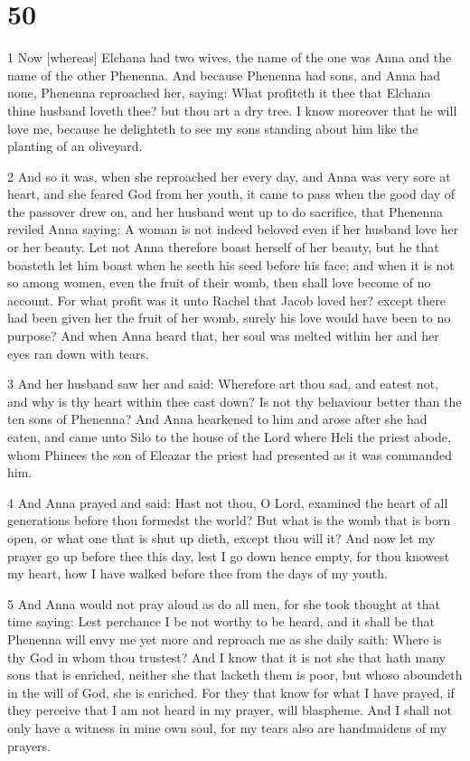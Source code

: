 \chapter{50}

\par 1 Now [whereas] Elchana had two wives, the name of the one was Anna and the name of the other Phenenna. And because Phenenna had sons, and Anna had none, Phenenna reproached her, saying: What profiteth it thee that Elchana thine husband loveth thee? but thou art a dry tree. I know moreover that he will love me, because he delighteth to see my sons standing about him like the planting of an oliveyard. 

\par 2 And so it was, when she reproached her every day, and Anna was very sore at heart, and she feared God from her youth, it came to pass when the good day of the passover drew on, and her husband went up to do sacrifice, that Phenenna reviled Anna saying: A woman is not indeed beloved even if her husband love her or her beauty. Let not Anna therefore boast herself of her beauty, but he that boasteth let him boast when he seeth his seed before his face; and when it is not so among women, even the fruit of their womb, then shall love become of no account. For what profit was it unto Rachel that Jacob loved her? except there had been given her the fruit of her womb, surely his love would have been to no purpose? And when Anna heard that, her soul was melted within her and her eyes ran down with tears. 

\par 3 And her husband saw her and said: Wherefore art thou sad, and eatest not, and why is thy heart within thee cast down? Is not thy behaviour better than the ten sons of Phenenna? And Anna hearkened to him and arose after she had eaten, and came unto Silo to the house of the Lord where Heli the priest abode, whom Phinees the son of Eleazar the priest had presented as it was commanded him. 

\par 4 And Anna prayed and said: Hast not thou, O Lord, examined the heart of all generations before thou formedst the world? But what is the womb that is born open, or what one that is shut up dieth, except thou will it? And now let my prayer go up before thee this day, lest I go down hence empty, for thou knowest my heart, how I have walked before thee from the days of my youth. 

\par 5 And Anna would not pray aloud as do all men, for she took thought at that time saying: Lest perchance I be not worthy to be heard, and it shall be that Phenenna will envy me yet more and reproach me as she daily saith: Where is thy God in whom thou trustest? And I know that it is not she that hath many sons that is enriched, neither she that lacketh them is poor, but whoso aboundeth in the will of God, she is enriched. For they that know for what I have prayed, if they perceive that I am not heard in my prayer, will blaspheme. And I shall not only have a witness in mine own soul, for my tears also are handmaidens of my prayers. 

